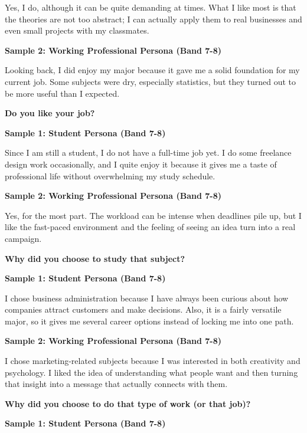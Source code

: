 Yes, I do, although it can be quite demanding at times. What I like most is that the theories are not too abstract; I can actually apply them to real businesses and even small projects with my classmates.

\textbf{Sample 2: Working Professional Persona (Band 7-8)}

Looking back, I did enjoy my major because it gave me a solid foundation for my current job. Some subjects were dry, especially statistics, but they turned out to be more useful than I expected.

\separator

\begin{ieltsquestion}
\textbf{Do you like your job?}
\end{ieltsquestion}
\textbf{Sample 1: Student Persona (Band 7-8)}

Since I am still a student, I do not have a full-time job yet. I do some freelance design work occasionally, and I quite enjoy it because it gives me a taste of professional life without overwhelming my study schedule.

\textbf{Sample 2: Working Professional Persona (Band 7-8)}

Yes, for the most part. The workload can be intense when deadlines pile up, but I like the fast-paced environment and the feeling of seeing an idea turn into a real campaign.

\separator

\begin{ieltsquestion}
\textbf{Why did you choose to study that subject?}
\end{ieltsquestion}
\textbf{Sample 1: Student Persona (Band 7-8)}

I chose business administration because I have always been curious about how companies attract customers and make decisions. Also, it is a fairly versatile major, so it gives me several career options instead of locking me into one path.

\textbf{Sample 2: Working Professional Persona (Band 7-8)}

I chose marketing-related subjects because I was interested in both creativity and psychology. I liked the idea of understanding what people want and then turning that insight into a message that actually connects with them.

\separator

\begin{ieltsquestion}
\textbf{Why did you choose to do that type of work (or that job)?}
\end{ieltsquestion}
\textbf{Sample 1: Student Persona (Band 7-8)}

